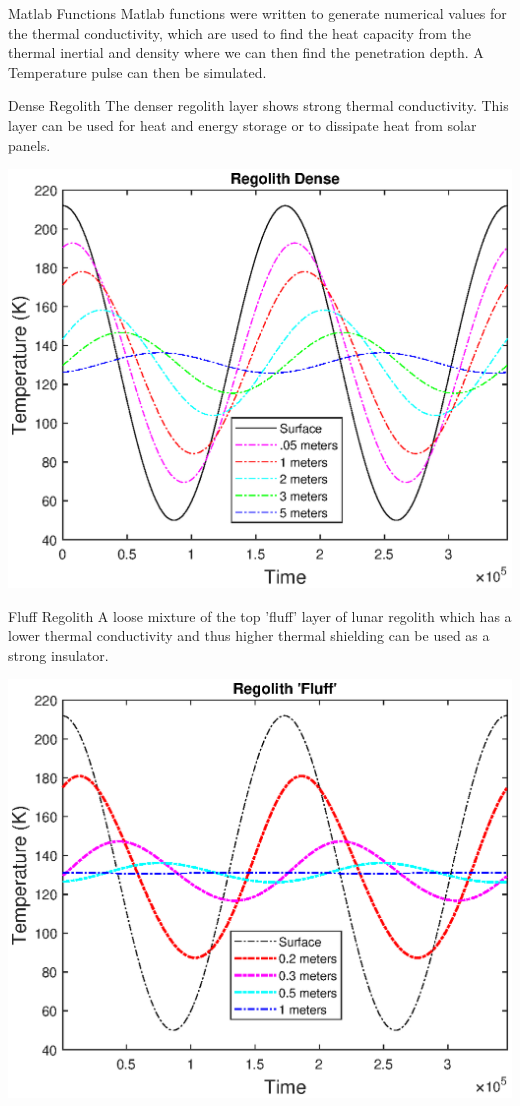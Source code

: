 \documentclass{beamer}
\begin{document}
\begin{frame}{Matlab Functions}
 Matlab functions were written to generate numerical values for the thermal conductivity, which are used to find the heat capacity from the thermal inertial and density where we can then find the penetration depth. A Temperature pulse can then be simulated.
\end{frame}

\begin{frame}{ Dense Regolith}
The denser regolith layer shows strong thermal conductivity. This layer can be used for heat and energy storage or to dissipate heat from solar panels.
 \begin{center}
             \includegraphics[width= .75\textwidth]{Regolith_Pulse.eps}   
      \end{center}  
\end{frame}


\begin{frame}{Fluff Regolith}
A loose mixture of the top 'fluff' layer of lunar regolith  which has a lower thermal conductivity and thus higher thermal shielding can be used as a strong insulator\cite{Malla}.
 \begin{center}
             \includegraphics[width= .75\textwidth]{Processed_Regolith.eps}   
      \end{center}  
\end{frame}
\end{document}
